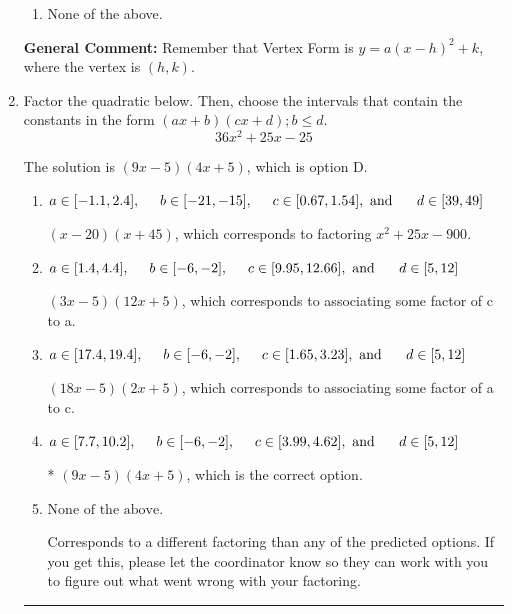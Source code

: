 \documentclass{extbook}[14pt]
\newcommand{\litem}[1]{\item #1

\rule{\textwidth}{0.4pt}}
\begin{document}
\begin{enumerate}
{\begin{enumerate}[label=\Alph*.]
\begin{multicols}{2}
\end{multicols}\item None of the above.\end{enumerate}
\textbf{General Comment:} Remember that Vertex Form is $y = a(x-h)^2+k$, where the vertex is $(h, k)$.
}
\litem{
Factor the quadratic below. Then, choose the intervals that contain the constants in the form $(ax+b)(cx+d); b \leq d.$
\[ 36x^{2} +25 x -25 \]

The solution is \( (9x -5)(4x + 5) \), which is option D.\begin{enumerate}[label=\Alph*.]
\item \( a \in [-1.1, 2.4], \hspace*{5mm} b \in [-21, -15], \hspace*{5mm} c \in [0.67, 1.54], \text{ and } \hspace*{5mm} d \in [39, 49] \)

 $(x -20)(x + 45)$, which corresponds to factoring $x^{2} +25 x -900$.
\item \( a \in [1.4, 4.4], \hspace*{5mm} b \in [-6, -2], \hspace*{5mm} c \in [9.95, 12.66], \text{ and } \hspace*{5mm} d \in [5, 12] \)

 $(3x -5)(12x + 5)$, which corresponds to associating some factor of c to a.
\item \( a \in [17.4, 19.4], \hspace*{5mm} b \in [-6, -2], \hspace*{5mm} c \in [1.65, 3.23], \text{ and } \hspace*{5mm} d \in [5, 12] \)

 $(18x -5)(2x + 5)$, which corresponds to associating some factor of a to c.
\item \( a \in [7.7, 10.2], \hspace*{5mm} b \in [-6, -2], \hspace*{5mm} c \in [3.99, 4.62], \text{ and } \hspace*{5mm} d \in [5, 12] \)

* $(9x -5)(4x + 5)$, which is the correct option.
\item \( \text{None of the above.} \)

 Corresponds to a different factoring than any of the predicted options. If you get this, please let the coordinator know so they can work with you to figure out what went wrong with your factoring.
\end{enumerate}

}
\end{enumerate}
\end{document}
